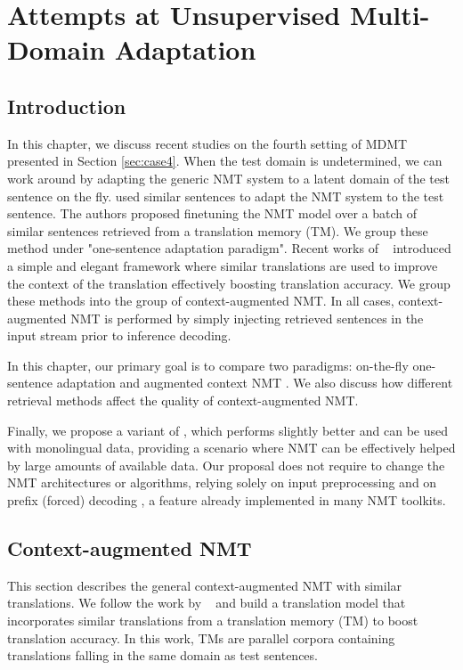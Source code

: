 \chapter{Attempts at Unsupervised Multi-Domain Adaptation}
\label{chap:priming}
\section{Introduction}
In this chapter, we discuss recent studies on the fourth setting of MDMT presented in Section \ref{sec:case4}. When the test domain is undetermined, we can work around by adapting the generic NMT system to a latent domain of the test sentence on the fly. \citet{Li18onesentence, Farajian17multidomain} used similar sentences to adapt the NMT system to the test sentence. The authors proposed finetuning the NMT model over a batch of similar sentences retrieved from a translation memory (TM). We group these method under "one-sentence adaptation paradigm". Recent works of ~\citet{bulte19neural,xu20boosting} introduced a simple and elegant framework where similar translations are used to improve the context of the translation effectively boosting translation accuracy. We group these methods into the group of context-augmented NMT. In all cases, context-augmented NMT is performed by simply injecting retrieved sentences in the input stream prior to inference decoding.

In this chapter, our primary goal is to compare two paradigms: on-the-fly one-sentence adaptation \citep{Li18onesentence, Farajian17multidomain} and augmented context NMT \citep{bulte19neural,xu20boosting}. We also discuss how different retrieval methods affect the quality of context-augmented NMT. 

Finally, we propose a variant of \citet{bulte19neural}, which performs slightly better and can be used with monolingual data, providing a scenario where NMT can be effectively helped by large amounts of available data. Our proposal does not require to change the NMT architectures or algorithms, relying solely on input preprocessing and on prefix (forced) decoding \citep{santy19inmt,rebecca16neural}, a feature already implemented in many NMT toolkits.

\section{Context-augmented NMT}
\label{sec:priming-chap8}
This section describes the general context-augmented NMT with similar translations. We follow the work by ~\citet{bulte19neural,xu20boosting} and build a translation model that incorporates similar translations from a translation memory (TM) to boost translation accuracy. In this work, TMs are parallel corpora containing translations falling in the same domain as test sentences.

